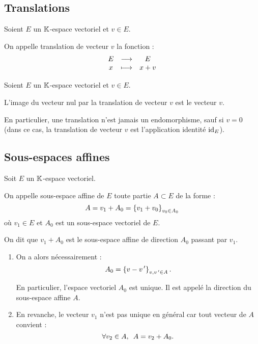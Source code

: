 \subsection{Translations}

\begin{defi}[Translation]
Soient \(E\) un \(\mathbb{K}\)-espace vectoriel et \(v\in E\).

On appelle translation de vecteur \(v\) la fonction : \[\begin{array}[t]{ccc}E & \longrightarrow & E \\ x & \longmapsto & x+v\end{array}\]
\end{defi}

\begin{rem}
Soient \(E\) un \(\mathbb{K}\)-espace vectoriel et \(v\in E\).

L'image du vecteur nul par la translation de vecteur \(v\) est le vecteur \(v\).

En particulier, une translation n'est jamais un endomorphisme, sauf si \(v=0\) (dans ce cas, la translation de vecteur \(v\) est l'application identité \(\mathrm{id}_{E}\)).
\end{rem}

\subsection{Sous-espaces affines}

\begin{defprop}
Soit \(E\) un \(\mathbb{K}\)-espace vectoriel.

On appelle sous-espace affine de \(E\) toute partie \(A\subset E\) de la forme : \[A=v_1+A_0=\left\lbrace v_1+v_0\right\rbrace_{v_0\in A_0}\] où \(v_1\in E\) et \(A_0\) est un sous-espace vectoriel de \(E\).

On dit que \(v_1+A_0\) est le sous-espace affine de direction \(A_0\) passant par \(v_1\).

\begin{enumerate}
\item On a alors nécessairement : \[A_0=\left\lbrace v-v^{\,\prime}\right\rbrace_{v,v^{\,\prime}\in A}.\]

En particulier, l'espace vectoriel \(A_0\) est unique. Il est appelé la direction du sous-espace affine \(A\). \\

\item En revanche, le vecteur \(v_1\) n'est pas unique en général car tout vecteur de \(A\) convient : \[\quantifs{\forall v_2\in A}A=v_2+A_0.\]
\end{enumerate}
\end{defprop}

